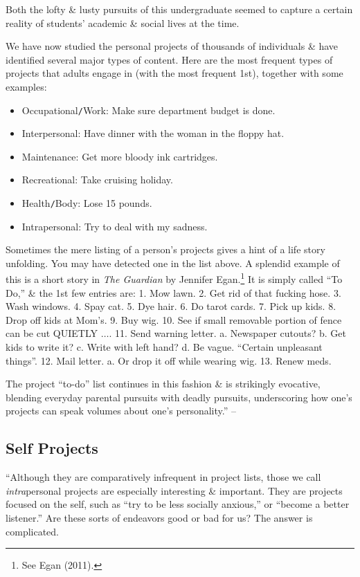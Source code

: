 \documentclass{article}
\numberwithin{equation}{section}
\begin{document}
Both the lofty \& lusty pursuits of this undergraduate seemed to capture a certain reality of students' academic \& social lives at the time.

We have now studied the personal projects of thousands of individuals \& have identified several major types of content. Here are the most frequent types of projects that adults engage in (with the most frequent 1st), together with some examples:
\begin{itemize}
	\item Occupational\texttt{/}Work: Make sure department budget is done.
	\item Interpersonal: Have dinner with the woman in the floppy hat.
	\item Maintenance: Get more bloody ink cartridges.
	\item Recreational: Take cruising holiday.
	\item Health\texttt{/}Body: Lose 15 pounds.
	\item Intrapersonal: Try to deal with my sadness.
\end{itemize}
Sometimes the mere listing of a person's projects gives a hint of a life story unfolding. You may have detected one in the list above. A splendid example of this is a short story in \textit{The Guardian} by Jennifer Egan.\footnote{See Egan (2011).} It is simply called ``To Do,'' \& the 1st few entries are: 1. Mow lawn. 2. Get rid of that fucking hose. 3. Wash windows. 4. Spay cat. 5. Dye hair. 6. Do tarot cards. 7. Pick up kids. 8. Drop off kids at Mom's. 9. Buy wig. 10. See if small removable portion of fence can be cut QUIETLY $\ldots$. 11. Send warning letter. a. Newspaper cutouts? b. Get kids to write it? c. Write with left hand? d. Be vague. ``Certain unpleasant things''. 12. Mail letter. a. Or drop it off while wearing wig. 13. Renew meds.

The project ``to-do'' list continues in this fashion \& is strikingly evocative, blending everyday parental pursuits with deadly pursuits, underscoring how one's projects can speak volumes about one's personality.'' -- \cite[pp. 31--32]{Little2017}

\subsection{Self Projects}
``Although they are comparatively infrequent in project lists, those we call \textit{intra}personal projects are especially interesting \& important. They are projects focused on the self, such as ``try to be less socially anxious,'' or ``become a better listener.'' Are these sorts of endeavors good or bad for us? The answer is complicated.
\end{document}
